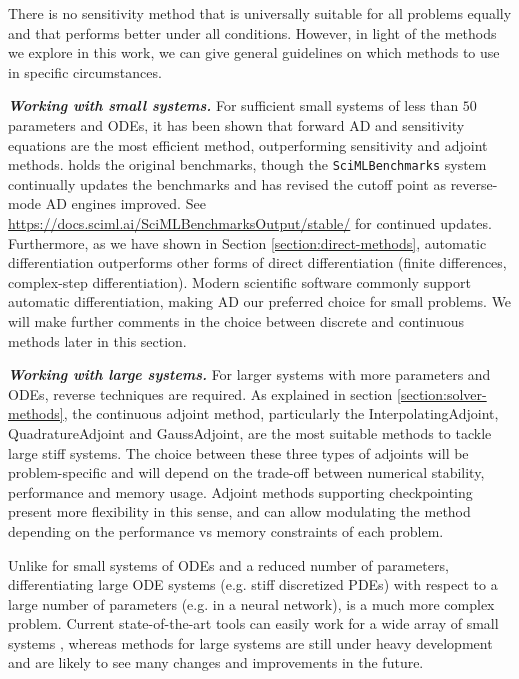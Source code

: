 There is no sensitivity method that is universally suitable for all problems equally and that performs better under all conditions. 
However, in light of the methods we explore in this work, we can give general guidelines on which methods to use in specific circumstances.

\vspace{5px}
\noindent\textit{\textbf{Working with small systems.}}
For sufficient small systems of less than $50$ parameters and ODEs, it has been shown that forward AD and sensitivity equations are the most efficient method, outperforming sensitivity and adjoint methods. \cite{ma2021comparison} holds the original benchmarks, though the \texttt{SciMLBenchmarks} system continually updates the benchmarks and has revised the cutoff point as reverse-mode AD engines improved. 
See \url{https://docs.sciml.ai/SciMLBenchmarksOutput/stable/} for continued updates.
Furthermore, as we have shown in Section \ref{section:direct-methods}, automatic differentiation outperforms other forms of direct differentiation (finite differences, complex-step differentiation). 
Modern scientific software commonly support automatic differentiation, making AD our preferred choice for small problems. 
We will make further comments in the choice between discrete and continuous methods later in this section.

\vspace{5px}
\noindent\textit{\textbf{Working with large systems. }}
For larger systems with more parameters and ODEs, reverse techniques are required. As explained in section \ref{section:solver-methods}, the continuous adjoint method, particularly the InterpolatingAdjoint, QuadratureAdjoint and GaussAdjoint, are the most suitable methods to tackle large stiff systems. The choice between these three types of adjoints will be problem-specific and will depend on the trade-off between numerical stability, performance and memory usage. Adjoint methods supporting checkpointing present more flexibility in this sense, and can allow modulating the method depending on the performance vs memory constraints of each problem. 

Unlike for small systems of ODEs and a reduced number of parameters, differentiating large ODE systems (e.g. stiff discretized PDEs) with respect to a large number of parameters (e.g. in a neural network), is a much more complex problem. Current state-of-the-art tools can easily work for a wide array of small systems \cite{rackauckas2020universal}, whereas methods for large systems are still under heavy development and are likely to see many changes and improvements in the future. 

